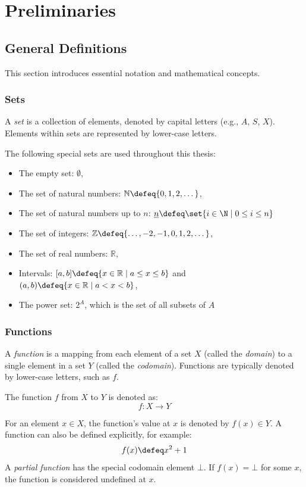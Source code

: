 \chapter{Preliminaries}
\section{General Definitions}
This section introduces essential notation and mathematical concepts. 

\subsection{Sets}
A \textit{set} is a collection of elements, denoted by capital letters (e.g., $A$, $S$, $X$). Elements within sets are represented by lower-case letters.

The following special sets are used throughout this thesis:
\begin{itemize}
    \item The empty set: $\emptyset$,
    \item The set of natural numbers: $\mathbb{N} \defeq \{0, 1, 2, \dots\}$,
    \item The set of natural numbers up to $n$: $\underline{n}\defeq\set{i\in\N\mid 0\leq i\leq n}$
    \item The set of integers: $\mathbb{Z} \defeq \{\dots, -2, -1, 0, 1, 2, \dots\}$,
    \item The set of real numbers: $\mathbb{R}$,
    \item Intervals: $[a, b] \defeq \{x \in \mathbb{R} \mid a \leq x \leq b\}$ and $(a, b) \defeq \{x \in \mathbb{R} \mid a < x < b\}$,
    \item The power set: $2^A$, which is the set of all subsets of $A$ 
\end{itemize}

\subsection{Functions}
A \textit{function} is a mapping from each element of a set $X$ (called the \textit{domain}) to a single element in a set $Y$ (called the \textit{codomain}). Functions are typically denoted by lower-case letters, such as $f$. 

The function $f$ from $X$ to $Y$ is denoted as:
\[
f: X \to Y
\]

For an element $x \in X$, the function’s value at $x$ is denoted by $f(x) \in Y$. A function can also be defined explicitly, for example:
\[
f(x) \defeq x^2 + 1
\]
A \textit{partial function} has the special codomain element $\bot$. If $f(x) = \bot$ for some $x$, the function is considered undefined at $x$.


